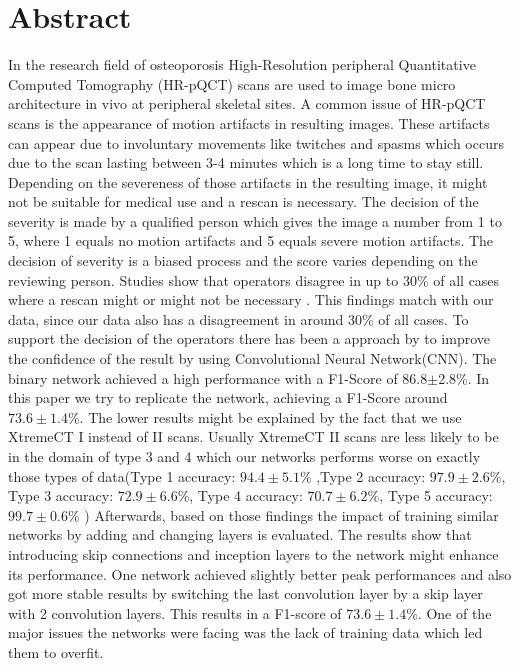 \documentclass[
a4paper, 
12pt,
grayscalebody, %
abstract=on,
twoside, BCOR10mm, 12pt, DIV13,headinclude, footexclude, final, abstracton, openright
]{ibireprt}
\numberwithin{equation}{chapter}
\numberwithin{table}{chapter}
\numberwithin{figure}{chapter}
\numberwithin{algorithm}{chapter}
\numberwithin{example}{chapter}
\numberwithin{example}{chapter}
\begin{document}
\chapter*{Abstract}
In the research field of osteoporosis High-Resolution peripheral Quantitative Computed Tomography (HR-pQCT) scans are used to image bone micro architecture in vivo at peripheral skeletal sites. A common issue of HR-pQCT scans is the appearance of motion artifacts in resulting images. These artifacts can appear due to involuntary movements like twitches and spasms which occurs due to the scan lasting between 3-4 minutes which is a long time to stay still. Depending on the severeness of those artifacts in the resulting image, it might not be suitable for medical use and a rescan is necessary. The decision of the severity is made by a qualified person which gives the image a number from 1 to 5, where 1 equals no motion artifacts and 5 equals severe motion artifacts. The decision of severity is a biased process and the score varies depending on the reviewing person. Studies show that operators disagree in up to 30\% of all cases where a rescan might or might not be necessary \cite{Walle2023}. This findings match with our data, since our data also has a disagreement in around 30\% of all cases. To support the decision of the operators there has been a approach by \cite{Walle2023} to improve the confidence of the result by using Convolutional Neural Network(CNN). The binary network achieved a high performance with a F1-Score of 86.8$\pm$2.8\%. In this paper we try to replicate the network, achieving a F1-Score around $73.6\pm1.4\%$.
The lower results might be explained by the fact that we use XtremeCT I instead of II scans. Usually XtremeCT II scans are less likely to be in the domain of type 3 and 4 which our networks performs worse on exactly those types of data(Type 1 accuracy: $94.4\pm5.1\%$ ,Type 2 accuracy: $97.9\pm2.6\%$, Type 3 accuracy: $72.9\pm6.6\%$, Type 4 accuracy: $70.7\pm6.2\%$, Type 5 accuracy: $99.7\pm0.6\%$ ) Afterwards, based on those findings the impact of training similar networks by adding and changing layers is evaluated. The results show that introducing skip connections and inception layers to the network might enhance its performance. One network achieved slightly better peak performances and also got more stable results by switching the last convolution layer by a skip layer with 2 convolution layers. This results in a F1-score of $73.6\pm1.4\%$. One of the major issues the networks were facing was the lack of training data which led them to overfit. 
\end{document}
